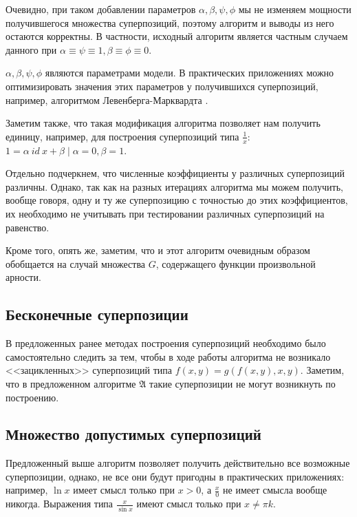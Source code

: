 \documentclass[12pt,a4paper]{amsart}
\begin{document}
Очевидно, при таком добавлении параметров $\alpha, \beta, \psi, \phi$
мы не изменяем мощности получившегося множества суперпозиций, поэтому
алгоритм и выводы из него остаются корректны. В частности, исходный алгоритм
является частным случаем данного при
$\alpha \equiv \psi \equiv 1, \beta \equiv \phi \equiv 0$.

$\alpha, \beta, \psi, \phi$ являются параметрами модели. В практических
приложениях можно оптимизировать значения этих параметров у получившихся
суперпозиций, например, алгоритмом Левенберга-Марквардта
\cite{Marquardt1963Algorithm} \cite{more:78}.

Заметим также, что такая модификация алгоритма позволяет нам получить единицу,
например, для построения суперпозиций типа $\frac{1}{x}$:
$1 = \alpha\ id\ x + \beta \mid \alpha = 0, \beta = 1$.

Отдельно подчеркнем, что численные коэффициенты у различных суперпозиций
различны. Однако, так как на разных итерациях алгоритма мы можем получить,
вообще говоря, одну и ту же суперпозицию с точностью до этих коэффициентов,
их необходимо не учитывать при тестировании различных суперпозиций на
равенство.

Кроме того, опять же, заметим, что и этот алгоритм очевидным образом
обобщается на случай множества $G$, содержащего функции произвольной арности.

\subsection{Бесконечные суперпозиции}

В предложенных ранее методах\cite{Zelinka2008} построения суперпозиций
необходимо было самостоятельно следить за тем, чтобы в ходе работы алгоритма
не возникало <<зацикленных>> суперпозиций типа $f(x, y) = g (f(x, y), x, y)$.
Заметим, что в предложенном алгоритме $\mathfrak{A}$ такие суперпозиции
не могут возникнуть по построению.

\subsection{Множество допустимых суперпозиций}

Предложенный выше алгоритм позволяет получить действительно все возможные
суперпозиции, однако, не все они будут пригодны в практических приложениях:
например, $\ln x$ имеет смысл только при $x > 0$, а $\frac{x}{0}$ не имеет
смысла вообще никогда. Выражения типа $\frac{x}{\sin x}$ имеют смысл только
при $x \neq \pi k$.
\end{document}
